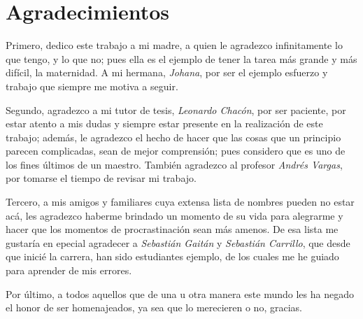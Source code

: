 \chapter*{Agradecimientos}
Primero, dedico este trabajo a mi madre, a quien le agradezco infinitamente lo que tengo, y lo que no; pues ella es el ejemplo de tener la tarea más grande y más difícil, la maternidad. A mi hermana, \textit{Johana}, por ser el ejemplo esfuerzo y trabajo que siempre me motiva a seguir.

Segundo, agradezco a mi tutor de tesis, \textit{Leonardo Chacón}, por ser paciente, por estar atento a mis dudas y siempre estar presente en la realización de este trabajo; además, le agradezco el hecho de hacer que las cosas que un principio parecen complicadas, sean de mejor comprensión; pues considero que es uno de los fines últimos de un maestro. También agradezco al profesor \textit{Andrés Vargas}, por tomarse el tiempo de revisar mi trabajo.

Tercero, a mis amigos y familiares cuya extensa lista de nombres pueden no estar acá, les agradezco haberme brindado un momento de su vida para alegrarme y hacer que los momentos de procrastinación sean más amenos. De esa lista me gustaría en epecial agradecer a \textit{Sebastián Gaitán} y \textit{Sebastián Carrillo}, que desde que inicié la carrera, han sido estudiantes ejemplo, de los cuales me he guiado para aprender de mis errores.

Por último, a todos    aquellos que de  una u otra manera este mundo les  ha negado  el honor de  ser  homenajeados,  ya sea  que lo merecieren o no, gracias. 